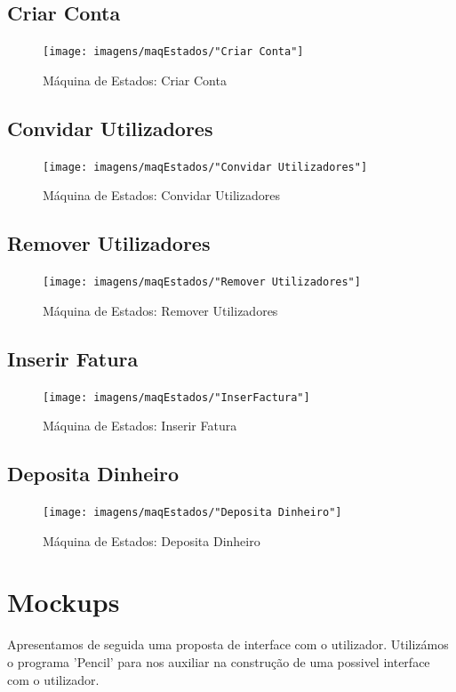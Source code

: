 \subsection{Criar Conta}
\begin{figure}[htb!]
	\centering
	\texttt{[image: imagens/maqEstados/"Criar Conta"]}  
	\caption{Máquina de Estados: Criar Conta}  
\end{figure}

\subsection{Convidar Utilizadores}
\begin{figure}[htb!]
	\centering
	\texttt{[image: imagens/maqEstados/"Convidar Utilizadores"]}  
	\caption{Máquina de Estados: Convidar Utilizadores}  
\end{figure}

\subsection{Remover Utilizadores}
\begin{figure}[htb!]
	\centering
	\texttt{[image: imagens/maqEstados/"Remover Utilizadores"]}  
	\caption{Máquina de Estados: Remover Utilizadores}  
\end{figure}

\subsection{Inserir Fatura}
\begin{figure}[htb!]
	\centering
	\texttt{[image: imagens/maqEstados/"InserFactura"]}  
	\caption{Máquina de Estados: Inserir Fatura}  
\end{figure}

\subsection{Deposita Dinheiro}
\begin{figure}[htb!]
	\centering
	\texttt{[image: imagens/maqEstados/"Deposita Dinheiro"]}  
	\caption{Máquina de Estados: Deposita Dinheiro}  
\end{figure}

\newpage
\section{Mockups}
Apresentamos de seguida uma proposta de interface com o utilizador. Utilizámos o programa 'Pencil' para nos auxiliar na construção de uma possivel interface com o utilizador. 


